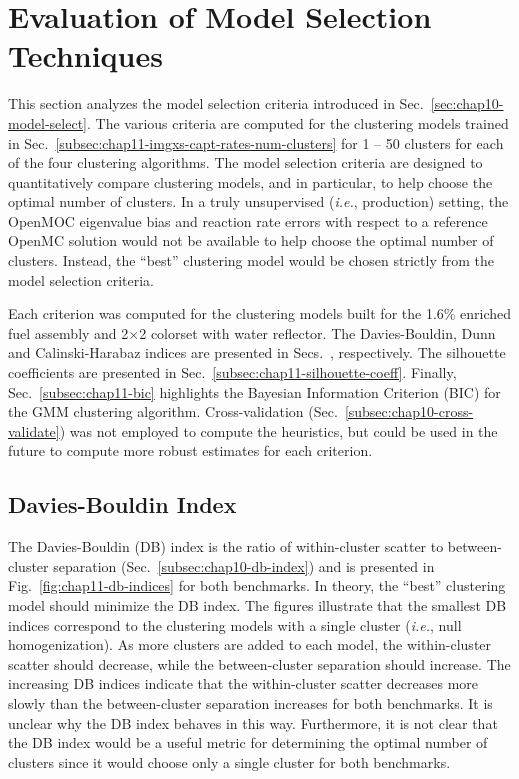 \clearpage


\section{Evaluation of Model Selection Techniques}
\label{sec:chap11-model-select}

This section analyzes the model selection criteria introduced in Sec.~\ref{sec:chap10-model-select}. The various criteria are computed for the clustering models trained in Sec.~\ref{subsec:chap11-imgxs-capt-rates-num-clusters}  for 1 -- 50 clusters for each of the four clustering algorithms. The model selection criteria are designed to quantitatively compare clustering models, and in particular, to help choose the optimal number of clusters. In a truly unsupervised (\textit{i.e.}, production) setting, the OpenMOC eigenvalue bias and reaction rate errors with respect to a reference OpenMC solution would not be available to help choose the optimal number of clusters. Instead, the ``best'' clustering model would be chosen strictly from the model selection criteria.

Each criterion was computed for the clustering models built for the 1.6\% enriched fuel assembly and 2$\times$2 colorset with water reflector. The Davies-Bouldin, Dunn and Calinski-Harabaz indices are presented in Secs.~, respectively. The silhouette coefficients are presented in Sec.~\ref{subsec:chap11-silhouette-coeff}. Finally, Sec.~\ref{subsec:chap11-bic} highlights the Bayesian Information Criterion (BIC) for the \ac{GMM} clustering algorithm. Cross-validation (Sec.~\ref{subsec:chap10-cross-validate}) was not employed to compute the heuristics, but could be used in the future to compute more robust estimates for each criterion.	


\subsection{Davies-Bouldin Index}
\label{subsec:chap11-db-index}

The Davies-Bouldin (DB) index is the ratio of within-cluster scatter to between-cluster separation (Sec.~\ref{subsec:chap10-db-index}) and is presented in Fig.~\ref{fig:chap11-db-indices} for both benchmarks. In theory, the ``best'' clustering model should minimize the DB index. The figures illustrate that the smallest DB indices correspond to the clustering models with a single cluster (\textit{i.e.}, null homogenization). As more clusters are added to each model, the within-cluster scatter should decrease, while the between-cluster separation should increase. The increasing DB indices indicate that the within-cluster scatter decreases more slowly than the between-cluster separation increases for both benchmarks. It is unclear why the DB index behaves in this way. Furthermore, it is not clear that the DB index would be a useful metric for determining the optimal number of clusters since it would choose only a single cluster for both benchmarks.

